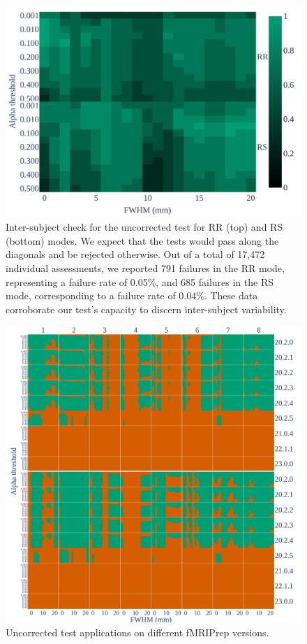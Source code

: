 \documentclass[lettersize,journal]{IEEEtran}
\newcommand{\fmriprep}{fMRIPrep\xspace}
\begin{document}
\begin{figure}
    \centering
    \includegraphics[width=\linewidth]{figures/inter-subject/inter_pce.pdf}
    \caption{Inter-subject check for the uncorrected test for RR (top) and RS (bottom) modes. We expect that the tests would pass along the diagonals and be rejected otherwise.
        Out of a total of 17,472 individual assessments, we reported 791 failures in the RR mode, representing a failure rate of 0.05\%, and 685 failures in the RS mode, corresponding to a failure rate of 0.04\%. These data corroborate our test's capacity to discern inter-subject variability.
    }
    \label{fig:ieee-check-pce}
\end{figure}


\begin{figure}
    \centering
    \includegraphics[width=\linewidth]{figures/fmriprep-versions/versions_pce.pdf}
    \caption{Uncorrected test applications on different \fmriprep versions.}
    \label{fig:versions_pce}
\end{figure}
\end{document}
